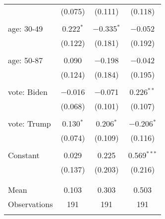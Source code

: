 \begin{tabular}{@{\extracolsep{5pt}}lccc}
  & (0.075) & (0.111) & (0.118) \\ 
  & & & \\ 
 age: 30-49 & 0.222$^{*}$ & $-$0.335$^{*}$ & $-$0.052 \\ 
  & (0.122) & (0.181) & (0.192) \\ 
  & & & \\ 
 age: 50-87 & 0.090 & $-$0.198 & $-$0.042 \\ 
  & (0.124) & (0.184) & (0.195) \\ 
  & & & \\ 
 vote: Biden & $-$0.016 & $-$0.071 & 0.226$^{**}$ \\ 
  & (0.068) & (0.101) & (0.107) \\ 
  & & & \\ 
 vote: Trump & 0.130$^{*}$ & 0.206$^{*}$ & $-$0.206$^{*}$ \\ 
  & (0.074) & (0.109) & (0.116) \\ 
  & & & \\ 
 Constant & 0.029 & 0.225 & 0.569$^{***}$ \\ 
  & (0.137) & (0.203) & (0.216) \\ 
  & & & \\ 
\hline \\[-1.8ex] 
Mean & 0.103 & 0.303 & 0.503 \\ 
Observations & 191 & 191 & 191 \\ 
\hline 
\hline \\[-1.8ex] 
\end{tabular} 
